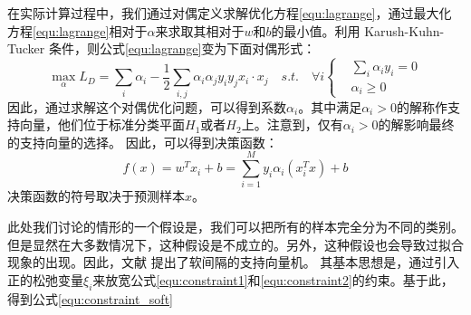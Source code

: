 在实际计算过程中，我们通过对偶定义求解优化方程\ref{equ:lagrange}，通过最大化方程\ref{equ:lagrange}相对于$\alpha$来求取其相对于$w$和$b$的最小值。利用 Karush-Kuhn-Tucker 条件，则公式\ref{equ:lagrange}变为下面对偶形式：
\begin{equation}
	\max \limits_{\alpha} L_D=\sum_i{\alpha_i}-\frac{1}{2}\sum_{i,j}\alpha_i\alpha_jy_iy_jx_i\cdot x_j \quad s.t. \quad \forall i
	\left\{
		\begin{aligned}
	   &\sum_i{\alpha_iy_i}=0  \\
	   &\alpha_i \geq 0
	   \end{aligned}
		\right.
\end{equation}
因此，通过求解这个对偶优化问题，可以得到系数$\alpha_i$。其中满足$\alpha_i>0$的解称作支持向量，他们位于标准分类平面$H_1$或者$H_2$上。注意到，仅有$\alpha_i>0$的解影响最终的支持向量的选择。
因此，可以得到决策函数：
\begin{equation}
	f(x)=w^Tx_i+b=\sum_{i=1}^My_i\alpha_i(x_i^Tx)+b
\end{equation}
决策函数的符号取决于预测样本$x$。

此处我们讨论的情形的一个假设是，我们可以把所有的样本完全分为不同的类别。但是显然在大多数情况下，这种假设是不成立的。另外，这种假设也会导致过拟合现象的出现。因此，文献 \cite{cortes1995support} 提出了软间隔的支持向量机。
其基本思想是，通过引入正的松弛变量$\xi_i$来放宽公式\ref{equ:constraint1}和\ref{equ:constraint2}的约束。基于此，得到公式\ref{equ:constraint_soft}

